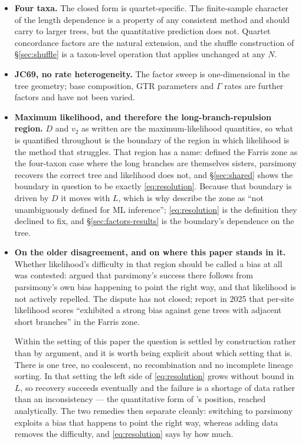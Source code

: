 \documentclass[preprint,12pt,authoryear]{elsarticle}
\theoremstyle{definition}
\theoremstyle{remark}
\begin{document}
\begin{itemize}
\item \textbf{Four taxa.} The closed form is quartet-specific. The
  finite-sample character of the length dependence is a property of any
  consistent method and should carry to larger trees, but the quantitative
  prediction does not. Quartet concordance factors are the natural extension,
  and the shuffle construction of \S\ref{sec:shuffle} is a taxon-level
  operation that applies unchanged at any $N$.
\item \textbf{JC69, no rate heterogeneity.} The factor sweep is
  one-dimensional in the tree geometry; base composition, GTR parameters and
  $\Gamma$ rates are further factors and have not been varied.
\item \textbf{Maximum likelihood, and therefore the long-branch-repulsion
  region.} $D$ and $v_2$ as written are the maximum-likelihood
  quantities, so what is quantified throughout is the boundary of the region
  in which likelihood is the method that struggles. That region has a name:
  \citet{siddall1998} defined the Farris zone as the four-taxon case where
  the long branches are themselves sisters, parsimony recovers the correct
  tree and likelihood does not, and \S\ref{sec:shared} shows the boundary in
  question to be exactly \eqref{eq:resolution}. Because that boundary is
  driven by $D$ it moves with $L$, which is why
  \citet{leuchtenberger2020} describe the zone as ``not unambiguously
  defined for ML inference''; \eqref{eq:resolution} is the definition they
  declined to fix, and \S\ref{sec:factors-results} is the boundary's
  dependence on
  the tree.
\item \textbf{On the older disagreement, and on where this paper stands in
  it.} Whether likelihood's difficulty in that region should be called a bias
  at all was contested: \citet{swofford2001} argued that parsimony's success
  there follows from parsimony's own bias happening to point the right way,
  and that likelihood is not actively repelled. The dispute has not closed;
  \citet{zhang2025caster} report in 2025 that per-site likelihood scores
  ``exhibited a strong bias against gene trees with adjacent short branches''
  in the Farris zone.

  Within the setting of this paper the question is settled by construction
  rather than by argument, and it is worth being explicit about which setting
  that is. There is one tree, no coalescent, no recombination and no
  incomplete lineage sorting. In that setting the left side of
  \eqref{eq:resolution} grows without bound in $L$, so recovery succeeds
  eventually and the failure is a shortage of data rather than an
  inconsistency --- the quantitative form of \citet{swofford2001}'s position,
  reached analytically. The two remedies then separate cleanly: switching to
  parsimony exploits a bias that happens to point the right way, whereas
  adding data removes the difficulty, and \eqref{eq:resolution} says by how
  much.


\end{itemize}
\end{document}
